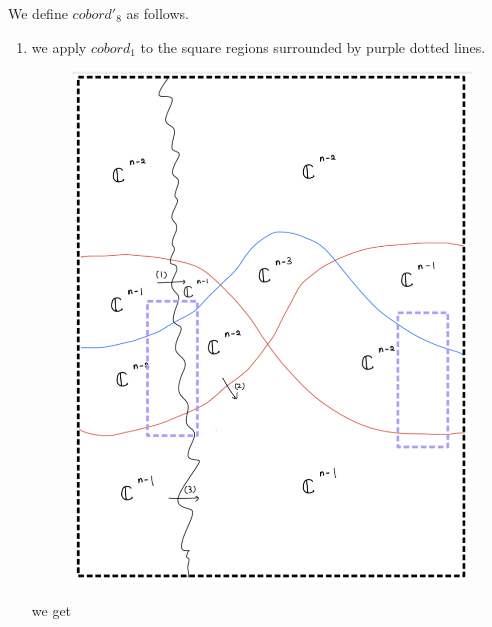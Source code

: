 We define $cobord'_8$ as follows.
\begin{enumerate}[label=(Step \arabic*)]
\item we apply $cobord_1$ to the square regions surrounded by purple dotted lines.

\begin{figure}[H]
    \centering
    \includegraphics[scale = 0.95]{diagrams/cobord'8/2.png}
    \caption{}
    \label{fig:your-label}
\end{figure}

we get


\end{enumerate}
